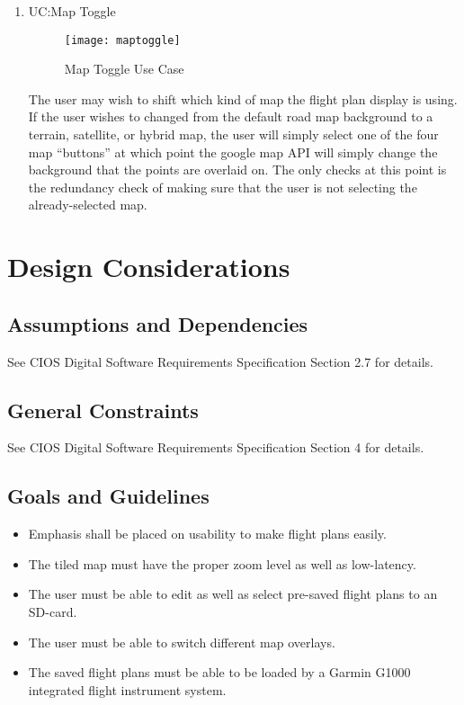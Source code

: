 \documentclass[12pt, letterpaper]{article}
\begin{document}
\begin{enumerate}
      \item UC:Map Toggle
	\begin{figure}[!ht]
		\caption{Map Toggle Use Case}
    		\centering
    		\texttt{[image: maptoggle]}
	\end{figure}
	The user may wish to shift which kind of map the flight plan display is using. If the user wishes to changed from the default road map background to a terrain, satellite, or hybrid map, the user will simply select one of the four map “buttons” at which point the google map API will simply change the background that the points are overlaid on. The only checks at this point is the redundancy check of making sure that the user is not selecting the already-selected map. 

    \end{enumerate}

\newpage
\section{Design Considerations} \label{dsign}
  \subsection{Assumptions and Dependencies}
    See CIOS Digital Software Requirements Specification Section 2.7 for details.
  \subsection{General Constraints}
    See CIOS Digital Software Requirements Specification Section 4 for details.
  \subsection{Goals and Guidelines}
    \begin{itemize}
      \setlength{\itemsep}{1pt}
      \setlength{\parskip}{0pt}
      \setlength{\parsep}{0pt}
      \item Emphasis shall be placed on usability to make flight plans easily.
      \item The tiled map must have the proper zoom level as well as low-latency.
      \item The user must be able to edit as well as select pre-saved flight plans to an SD-card.
      \item The user must be able to switch different map overlays.
      \item The saved flight plans must be able to be loaded by a Garmin G1000 integrated flight instrument system.
    \end{itemize}
\end{document}
